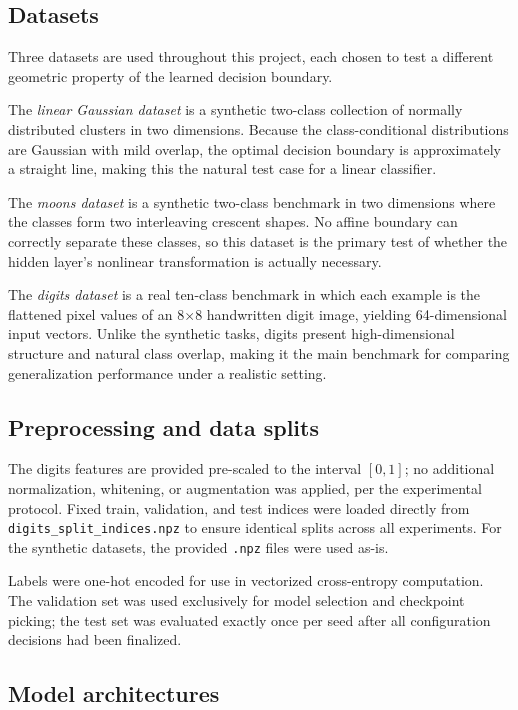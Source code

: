 \documentclass[11pt]{article}
\begin{document}
\subsection{Datasets}

Three datasets are used throughout this project, each chosen to test a different
geometric property of the learned decision boundary.

The \emph{linear Gaussian dataset} is a synthetic two-class collection of normally
distributed clusters in two dimensions. Because the class-conditional distributions
are Gaussian with mild overlap, the optimal decision boundary is approximately a
straight line, making this the natural test case for a linear classifier.

The \emph{moons dataset} is a synthetic two-class benchmark in two dimensions where
the classes form two interleaving crescent shapes. No affine boundary can correctly
separate these classes, so this dataset is the primary test of whether the hidden
layer's nonlinear transformation is actually necessary.

The \emph{digits dataset} is a real ten-class benchmark in which each example is the
flattened pixel values of an 8$\times$8 handwritten digit image, yielding 64-dimensional
input vectors. Unlike the synthetic tasks, digits present high-dimensional structure and
natural class overlap, making it the main benchmark for comparing generalization
performance under a realistic setting.

\subsection{Preprocessing and data splits}

The digits features are provided pre-scaled to the interval $[0,1]$; no additional
normalization, whitening, or augmentation was applied, per the experimental protocol.
Fixed train, validation, and test indices were loaded directly from
\texttt{digits\_split\_indices.npz} to ensure identical splits across all experiments.
For the synthetic datasets, the provided \texttt{.npz} files were used as-is.

Labels were one-hot encoded for use in vectorized cross-entropy computation. The
validation set was used exclusively for model selection and checkpoint picking; the
test set was evaluated exactly once per seed after all configuration decisions had
been finalized.

\subsection{Model architectures}
\end{document}
